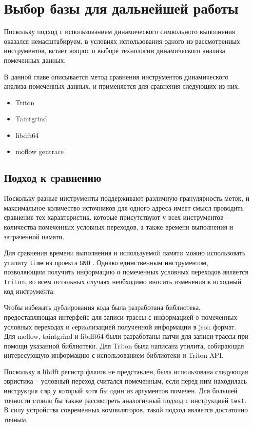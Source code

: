 \chapter{Выбор базы для дальнейшей работы}

Поскольку подход с использованием динамического символьного выполнения оказался немасштабируем, в условиях использования одного из рассмотренных инструментов, встает вопрос о выборе технологии динамического анализа помеченных данных.

В данной главе описывается метод сравнения инструментов динамического анализа помеченных данных, и применяется для сравнения следующих из них.

\begin{itemize}
    \item Triton
    \item Taintgrind
    \item libdft64
    \item moflow gentrace
\end{itemize}

\section{Подход к сравнению}

Поскольку разные инструменты поддерживают различную гранулярность меток, и максимальное количество источников для одного адреса имеет смысл проводить сравнение тех характеристик, которые присутствуют у всех инструментов -- количества помеченных условных переходов, а также времени выполнения и затраченной памяти.

Для сравнения времени выполнения и используемой памяти можно использовать утилиту \texttt{time} из проекта \texttt{GNU} \cite{TIME}. Однако единственным инструментом, позволяющим получить информацию о помеченных условных переходов является \texttt{Triton}, во всем остальных случаях необходимо вносить изменения в исходный код инструмента. 

Чтобы избежать дублирования кода была разработана библиотека, предоставляющая интерфейс для записи трассы с информацией о помеченных условных переходах и cериaлизацией полученной информации в json формат. Для moflow, taintgrind и libdft64 были разработаны патчи для записи трассы при помощи указанной библиотеки. Для Triton была написана утилита, собирающая интересующую информацию с использованием библиотеки и Triton API.

Поскольку в libdft регистр флагов не представлен, была использована следующая эвристика -- условный переход считался помеченным, если перед ним находилась инструкция \texttt{cmp} у который хотя бы один из аргументов помечен. Для большей точности стоило бы также рассмотреть аналогичный подход с инструкцией \texttt{test}. В силу устройства современных компиляторов, такой подход является достаточно точным.

